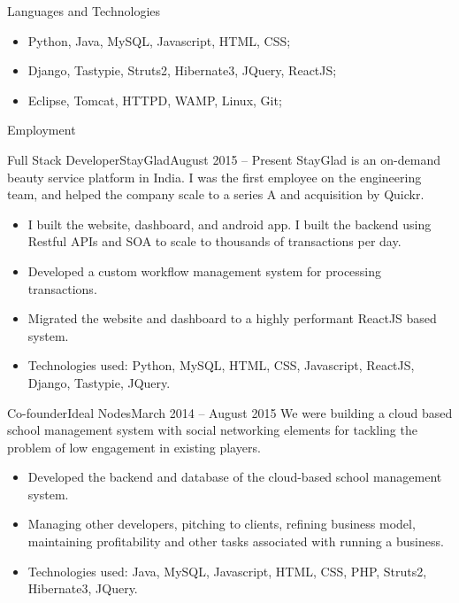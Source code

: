 \documentclass[]{mcdowellcv}
\begin{document}
	\makeheader

	\begin{cvsection}{Languages and Technologies}
		\begin{cvsubsection}{}{}{}	
			\begin{itemize}
				\item Python, Java, MySQL, Javascript, HTML, CSS;
				\item Django, Tastypie, Struts2, Hibernate3, JQuery, ReactJS;
				\item Eclipse, Tomcat, HTTPD, WAMP, Linux, Git;
			\end{itemize}
		\end{cvsubsection}
	\end{cvsection}
	
	\begin{cvsection}{Employment}
		\begin{cvsubsection}{Full Stack Developer}{StayGlad}{August 2015 – Present}
			StayGlad is an on-demand beauty service platform in India. I was the first employee on the engineering team, and helped the company scale to a series A and acquisition by Quickr.
			\begin{itemize}
				\item I built the website, dashboard, and android app. I built the backend using Restful APIs and SOA to scale to thousands of transactions per day.
				\item Developed a custom workflow management system for processing transactions.
				\item Migrated the website and dashboard to a highly performant ReactJS based system.
				\item Technologies used: Python, MySQL, HTML, CSS, Javascript, ReactJS, Django, Tastypie, JQuery.
			\end{itemize}
		\end{cvsubsection}
		
		\begin{cvsubsection}{Co-founder}{Ideal Nodes}{March 2014 – August 2015}	
			We were building a cloud based school management system with social networking elements for tackling the problem of low engagement in existing players.
			\begin{itemize}
				\item Developed the backend and database of the cloud-based school management system.
				\item Managing other developers, pitching to clients, refining business model, maintaining profitability and other tasks associated with running a business.
				\item Technologies used: Java, MySQL, Javascript, HTML, CSS, PHP, Struts2, Hibernate3, JQuery.
			\end{itemize}
		\end{cvsubsection}
		

\end{cvsection}
\end{document}
